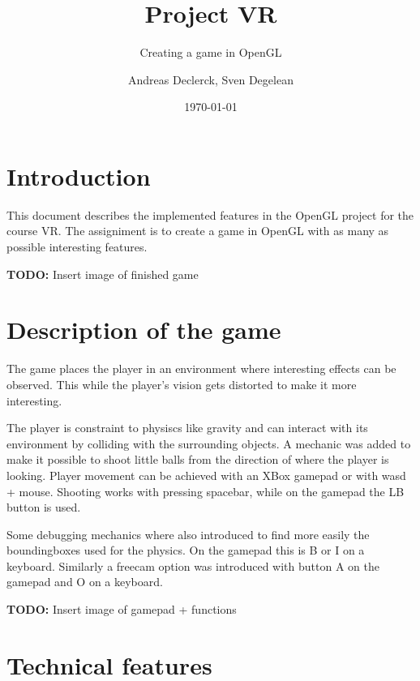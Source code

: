 \documentclass[]{article}
\title{Project VR}
\subtitle{Creating a game in OpenGL}
\author{Andreas Declerck, Sven Degelean}
\date{\today}
\newcommand*{\TODO}{\textbf{TODO: }}
\begin{document}
\maketitle

\section{Introduction}

This document describes the implemented features in the OpenGL project for the
course VR. The assigniment is to create a game in OpenGL with as many as possible
interesting features.

\TODO Insert image of finished game

\section{Description of the game}

The game places the player in an environment where interesting effects can be
observed. This while the player's vision gets distorted to make it more
interesting.

The player is constraint to physiscs like gravity and can interact with its
environment by colliding with the surrounding objects. A mechanic was added
to make it possible to shoot little balls from the direction of where the
player is looking. Player movement can be achieved with an XBox gamepad or with
wasd + mouse. Shooting works with pressing spacebar, while on the gamepad the LB
button is used.

Some debugging mechanics where also introduced to find more easily the
boundingboxes used for the physics. On the gamepad this is B or I on a keyboard.
Similarly a freecam option was introduced with button A on the gamepad and O on
a keyboard.

\TODO Insert image of gamepad + functions

\section{Technical features}
\end{document}
